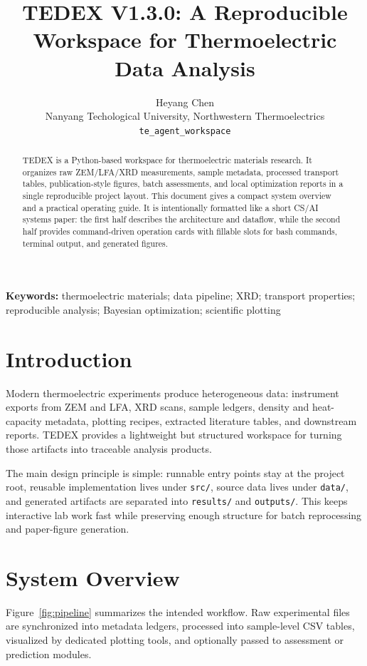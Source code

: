 \documentclass[10pt,twocolumn]{article}
\title{\vspace{-0.6em}\bfseries TEDEX V1.3.0: A Reproducible Workspace for Thermoelectric Data Analysis}
\author{
  Heyang Chen\\
  Nanyang Techological University, Northwestern Thermoelectrics\\
  \texttt{te\_agent\_workspace}
}
\date{\vspace{-0.8em}}
\newcommand{\code}[1]{\nolinkurl{#1}}
\begin{document}
\maketitle

\begin{abstract}
TEDEX is a Python-based workspace for thermoelectric materials research. It
organizes raw ZEM/LFA/XRD measurements, sample metadata, processed transport
tables, publication-style figures, batch assessments, and local optimization
reports in a single reproducible project layout. This document gives a compact
system overview and a practical operating guide. It is intentionally formatted
like a short CS/AI systems paper: the first half describes the architecture and
dataflow, while the second half provides command-driven operation cards with
fillable slots for bash commands, terminal output, and generated figures.
\end{abstract}

\noindent\textbf{Keywords:}
thermoelectric materials; data pipeline; XRD; transport properties; reproducible
analysis; Bayesian optimization; scientific plotting

\section{Introduction}

Modern thermoelectric experiments produce heterogeneous data: instrument exports
from ZEM and LFA, XRD scans, sample ledgers, density and heat-capacity metadata,
plotting recipes, extracted literature tables, and downstream reports. TEDEX
provides a lightweight but structured workspace for turning those artifacts into
traceable analysis products.

The main design principle is simple: runnable entry points stay at the project
root, reusable implementation lives under \code{src/}, source data lives under
\code{data/}, and generated artifacts are separated into \code{results/} and
\code{outputs/}. This keeps interactive lab work fast while preserving enough
structure for batch reprocessing and paper-figure generation.

\section{System Overview}

Figure~\ref{fig:pipeline} summarizes the intended workflow. Raw experimental
files are synchronized into metadata ledgers, processed into sample-level CSV
tables, visualized by dedicated plotting tools, and optionally passed to
assessment or prediction modules.
\end{document}
